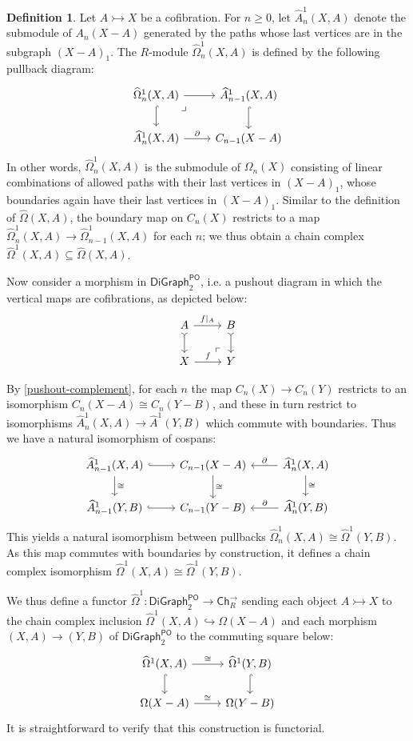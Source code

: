 \documentclass[11pt]{article}
\theoremstyle{definition}
\newtheorem{defi}[theo]{Definition}
\numberwithin{equation}{section}
\newcommand{\Ch}{\mathsf{Ch}}
\newcommand{\CofPO}{\mathsf{DiGraph}_2^{\mathsf{PO}}}
\newcommand{\W}{(X - A)_1}
\newcommand{\tOmega}{\widehat{\Omega}}
\newcommand{\tOmegaOne}{\widehat{\Omega}^1}
\newcommand{\tAOne}{\widehat{A}^1}
\newcommand{\pushout}{\arrow [dr, phantom, "\ulcorner" very near end]}
\newcommand{\pullback}{\arrow [dr, phantom, "\lrcorner" very near start]}
\newcommand{\bd}{\partial}
\newcommand{\cto}{\rightarrowtail}
\begin{document}
\begin{defi}
Let $A \cto X$ be a cofibration. For $n \geq 0$, let $\tAOne_n(X,A)$ denote the submodule of $A_n(X - A)$ generated by the paths whose last vertices are in the subgraph $\W$. The $R$-module $\tOmegaOne_{n}(X,A)$ is defined by the following pullback diagram:
\[
\begin{tikzcd}
\tOmegaOne_n(X,A) \arrow[r] \arrow[hook,d] \pullback & \tAOne_{n-1}(X,A) \arrow[hook,d] \\
\tAOne_n(X,A) \ar[r,"\bd",above] & C_{n-1}(X - A)
\end{tikzcd}
\]
In other words, $\tOmegaOne_n(X,A)$ is the submodule of $\Omega_{n}(X)$ consisting of linear combinations of allowed paths with their last vertices in $\W$, whose boundaries again have their last vertices in $\W$. Similar to the definition of $\tOmega(X,A)$, the boundary map on $C_n(X)$ restricts to a map $\tOmegaOne_n(X,A) \to \tOmegaOne_{n-1}(X,A)$ for each $n$; we thus obtain a chain complex $\tOmegaOne(X,A) \subseteq \tOmega(X,A)$.

Now consider a morphism in $\CofPO$, i.e. a pushout diagram in which the vertical maps are cofibrations, as depicted below:
\[
\begin{tikzcd}
    A \arrow[tail,d] \arrow[r,"f|_A"] \pushout & B \arrow[tail,d]  \\
    X \arrow[r,"f"] & Y
\end{tikzcd}
\]

By \cref{pushout-complement}, for each $n$ the map $C_n(X) \to C_n(Y)$ restricts to an isomorphism $C_n(X - A) \cong C_n(Y - B)$, and these in turn restrict to isomorphisms $\tAOne_n(X,A) \to \tAOne(Y,B)$ which commute with boundaries. Thus we have a natural isomorphism of cospans:
\[
\begin{tikzcd}
    \tAOne_{n-1}(X,A) \arrow[d,"\cong"] \arrow[hook,r] & C_{n-1}(X-A) \arrow[d,"\cong"] & \tAOne_n(X,A) \arrow["\bd",swap,l] \arrow[d,"\cong"] \\
    \tAOne_{n-1}(Y,B) \arrow[hook,r] & C_{n-1}(Y-B) & \tAOne_n(Y,B) \arrow["\bd",swap,l]
\end{tikzcd}
\]
This yields a natural isomorphism between pullbacks $\tOmegaOne_n(X,A) \cong \tOmegaOne(Y,B)$. As this map commutes with boundaries by construction, it defines a chain complex isomorphism $\tOmegaOne(X,A) \cong \tOmegaOne(Y,B)$.

We thus define a functor $\tOmegaOne \colon \CofPO \to \Ch_R^\to$ sending each object $A \cto X$ to the chain complex inclusion $\tOmegaOne(X,A) \hookrightarrow \Omega(X - A)$ and each morphism $(X,A) \to (Y,B)$ of $\CofPO$ to the commuting square below:
\[
\begin{tikzcd}
\tOmegaOne(X,A) \arrow[r,"\cong"] \arrow[d,hook] & \tOmegaOne(Y,B) \arrow[d,hook] \\
\Omega(X - A) \arrow[r,"\cong"] & \Omega(Y - B)
\end{tikzcd}
\]
It is straightforward to verify that this construction is functorial.
\end{defi}
\end{document}
